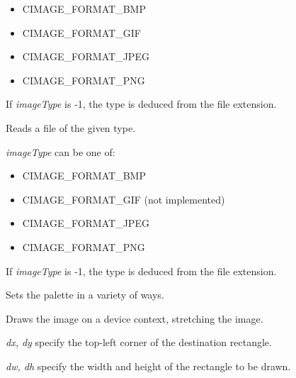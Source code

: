 \begin{itemize}\itemsep=0pt
\item CIMAGE\_FORMAT\_BMP
\item CIMAGE\_FORMAT\_GIF
\item CIMAGE\_FORMAT\_JPEG
\item CIMAGE\_FORMAT\_PNG
\end{itemize}

If {\it imageType} is -1, the type is deduced from the file extension.

\label{savefile}


Reads a file of the given type.

{\it imageType} can be one of:

\begin{itemize}\itemsep=0pt
\item CIMAGE\_FORMAT\_BMP
\item CIMAGE\_FORMAT\_GIF (not implemented)
\item CIMAGE\_FORMAT\_JPEG
\item CIMAGE\_FORMAT\_PNG
\end{itemize}

If {\it imageType} is -1, the type is deduced from the file extension.

\label{setpalette}




Sets the palette in a variety of ways.

\label{stretch}

 
Draws the image on a device context, stretching the image.

{\it dx, dy} specify the top-left corner of the destination rectangle.

{\it dw, dh} specify the width and height of the rectangle to be drawn.

